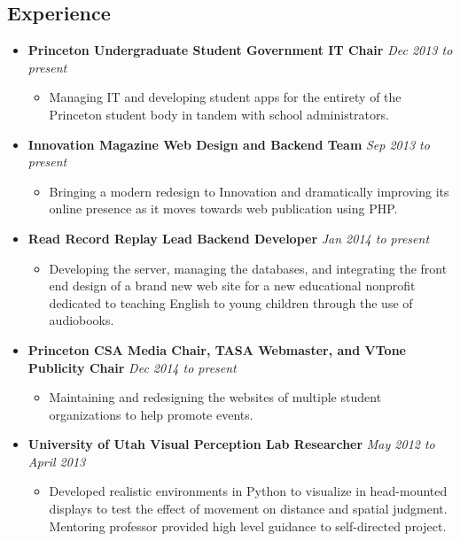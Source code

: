\documentclass[11pt]{article}
\begin{document}
\subsection*{\textbf{Experience}}

\begin{itemize}[nolistsep,topsep=0pt, label=]
\item \textbf{Princeton Undergraduate Student Government IT Chair} \emph{Dec 2013 to present}
\begin{itemize}[nolistsep,topsep=0pt, label=]
\item Managing IT and developing student apps for the entirety of the Princeton student body in tandem with school administrators.
\end{itemize}

\item \textbf{Innovation Magazine Web Design and Backend Team} \emph{Sep 2013 to present}
\begin{itemize}[nolistsep,topsep=0pt, label=]
\item Bringing a modern redesign to Innovation and dramatically improving its online presence as it moves towards web publication using PHP.
\end{itemize}

\item \textbf{Read Record Replay Lead Backend Developer} \emph{Jan 2014 to present}
\begin{itemize}[nolistsep,topsep=0pt, label=]
\item Developing the server, managing the databases, and integrating the front end design of a brand new web site for a new educational nonprofit dedicated to teaching English to young children through the use of audiobooks.
\end{itemize}

\item \textbf{Princeton CSA Media Chair, TASA Webmaster, and VTone Publicity Chair} \emph{Dec 2014 to present}
\begin{itemize}[nolistsep,topsep=0pt, label=]
\item Maintaining and redesigning the websites of multiple student organizations to help promote events.
\end{itemize}

\item \textbf{University of Utah Visual Perception Lab Researcher} \emph{May 2012 to April 2013}
\begin{itemize}[nolistsep,topsep=0pt, label=]
\item Developed realistic environments in Python to visualize in head-mounted displays to test the effect of movement on distance and spatial judgment. Mentoring professor provided high level guidance to self-directed project.
\end{itemize}


\end{itemize}
\end{document}
